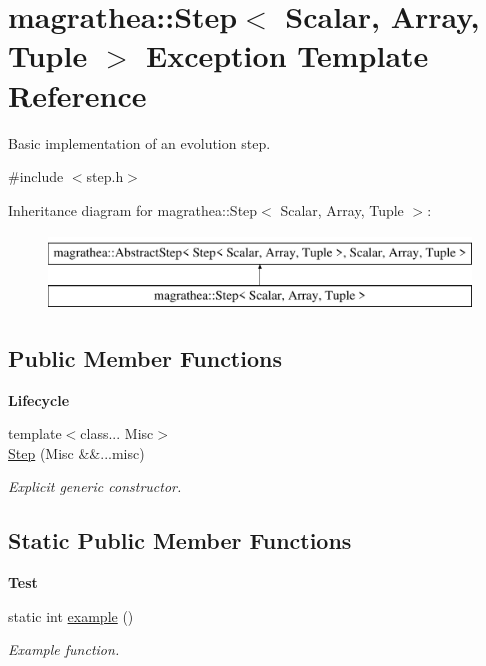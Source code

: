 \hypertarget{exceptionmagrathea_1_1Step}{\section{magrathea\-:\-:Step$<$ Scalar, Array, Tuple $>$ Exception Template Reference}
\label{exceptionmagrathea_1_1Step}
}


Basic implementation of an evolution step.  




{\ttfamily \#include $<$step.\-h$>$}

Inheritance diagram for magrathea\-:\-:Step$<$ Scalar, Array, Tuple $>$\-:\begin{figure}[H]
\begin{center}
\leavevmode
\includegraphics[height=2.000000cm]{exceptionmagrathea_1_1Step}
\end{center}
\end{figure}
\subsection*{Public Member Functions}
\begin{Indent}{\bf Lifecycle}\par
\begin{DoxyCompactItemize}
\item 
{\footnotesize template$<$class... Misc$>$ }\\\hyperlink{exceptionmagrathea_1_1Step_ac143df9cbe3e5791ac86c653a49ca02b}{Step} (Misc \&\&...misc)
\begin{DoxyCompactList}\small\item\em Explicit generic constructor. \end{DoxyCompactList}\end{DoxyCompactItemize}
\end{Indent}
\subsection*{Static Public Member Functions}
\begin{Indent}{\bf Test}\par
\begin{DoxyCompactItemize}
\item 
static int \hyperlink{exceptionmagrathea_1_1Step_a370057ab460a1568f615d26ae075d32d}{example} ()
\begin{DoxyCompactList}\small\item\em Example function. \end{DoxyCompactList}\end{DoxyCompactItemize}
\end{Indent}
